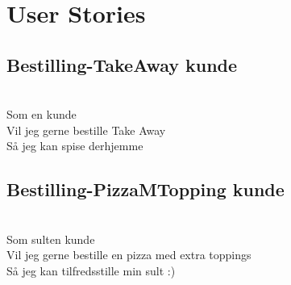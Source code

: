 \section{User Stories}


\subsection{Bestilling-TakeAway kunde}
\\
Som en kunde \\
Vil jeg gerne bestille Take Away\\
Så jeg kan spise derhjemme

\subsection{Bestilling-PizzaMTopping kunde}
\\
Som sulten kunde\\
Vil jeg gerne bestille en pizza med extra toppings\\
Så jeg kan tilfredsstille min sult :)
